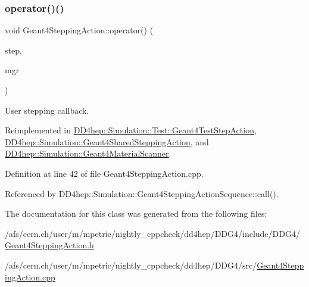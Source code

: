 \subsubsection{\texorpdfstring{operator()()}{operator()()}}
{\footnotesize\ttfamily void Geant4\+Stepping\+Action\+::operator() (\begin{DoxyParamCaption}\item[{const G4\+Step $\ast$}]{step,  }\item[{G4\+Stepping\+Manager $\ast$}]{mgr }\end{DoxyParamCaption})\hspace{0.3cm}{\ttfamily [virtual]}}



User stepping callback. 



Reimplemented in \hyperlink{class_d_d4hep_1_1_simulation_1_1_test_1_1_geant4_test_step_action_a19d915e8a634552f25a839a92843258a}{D\+D4hep\+::\+Simulation\+::\+Test\+::\+Geant4\+Test\+Step\+Action}, \hyperlink{class_d_d4hep_1_1_simulation_1_1_geant4_shared_stepping_action_a5128c3fa4f478cda734a35a09ee86ae0}{D\+D4hep\+::\+Simulation\+::\+Geant4\+Shared\+Stepping\+Action}, and \hyperlink{class_d_d4hep_1_1_simulation_1_1_geant4_material_scanner_abd897a6b73a1855f674962d0e6126c17}{D\+D4hep\+::\+Simulation\+::\+Geant4\+Material\+Scanner}.



Definition at line 42 of file Geant4\+Stepping\+Action.\+cpp.



Referenced by D\+D4hep\+::\+Simulation\+::\+Geant4\+Stepping\+Action\+Sequence\+::call().



The documentation for this class was generated from the following files\+:\begin{DoxyCompactItemize}
\item 
/afs/cern.\+ch/user/m/mpetric/nightly\+\_\+cppcheck/dd4hep/\+D\+D\+G4/include/\+D\+D\+G4/\hyperlink{_geant4_stepping_action_8h}{Geant4\+Stepping\+Action.\+h}\item 
/afs/cern.\+ch/user/m/mpetric/nightly\+\_\+cppcheck/dd4hep/\+D\+D\+G4/src/\hyperlink{_geant4_stepping_action_8cpp}{Geant4\+Stepping\+Action.\+cpp}\end{DoxyCompactItemize}
